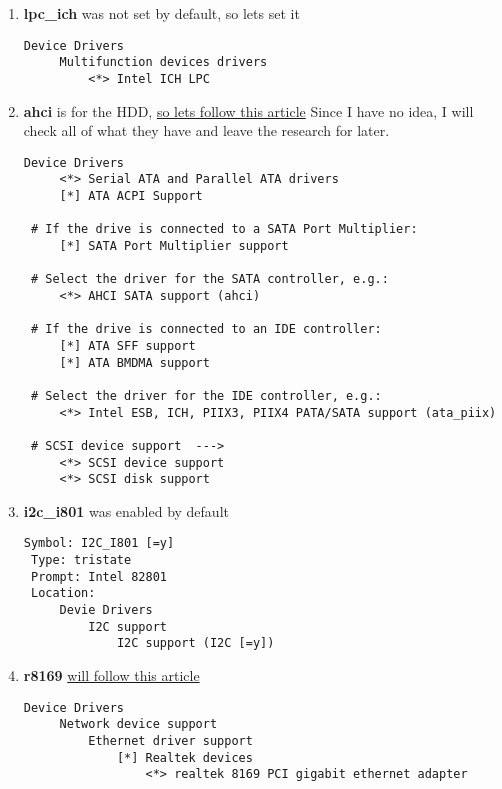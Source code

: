 \documentclass[10pt,a4paper]{article}
\begin{document}
\begin{enumerate}
                   \newpage
                   \item \textbf{lpc\_ich} was not set by default, so lets set it

                   \begin{lstlisting}[style=KernelConfig]
 Device Drivers
     Multifunction devices drivers
         <*> Intel ICH LPC
                   \end{lstlisting}

                   \newpage
                   \item \textbf{ahci} is for the HDD, \href{https://wiki.gentoo.org/wiki/HDD#Kernel}{so lets follow this article} Since I have no idea, I will check all of what they have and leave the research for later.

                   \begin{lstlisting}[style=KernelConfig]
 Device Drivers
     <*> Serial ATA and Parallel ATA drivers
     [*] ATA ACPI Support

 # If the drive is connected to a SATA Port Multiplier:
     [*] SATA Port Multiplier support

 # Select the driver for the SATA controller, e.g.:
     <*> AHCI SATA support (ahci)

 # If the drive is connected to an IDE controller:
     [*] ATA SFF support
     [*] ATA BMDMA support

 # Select the driver for the IDE controller, e.g.:
     <*> Intel ESB, ICH, PIIX3, PIIX4 PATA/SATA support (ata_piix)

 # SCSI device support  --->
     <*> SCSI device support
     <*> SCSI disk support
                   \end{lstlisting}

                   \newpage
                   \item \textbf{i2c\_i801} was enabled by default
                   \begin{lstlisting}[style=KernelConfig]
 Symbol: I2C_I801 [=y]
 Type: tristate
 Prompt: Intel 82801
 Location:
     Devie Drivers
         I2C support
             I2C support (I2C [=y])
                   \end{lstlisting}

                    \newpage
                    \item \textbf{r8169} \href{https://wiki.gentoo.org/wiki/Ethernet#Kernel}{will follow this article}

                    \begin{lstlisting}[style=KernelConfig]
 Device Drivers
     Network device support
         Ethernet driver support
             [*] Realtek devices
                 <*> realtek 8169 PCI gigabit ethernet adapter
                    \end{lstlisting}


\end{enumerate}
\end{document}
